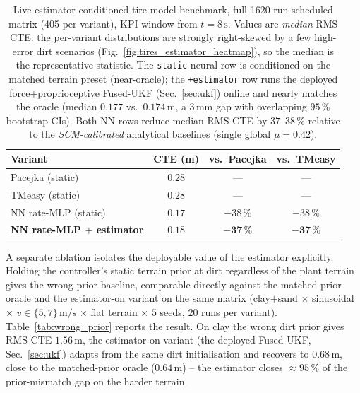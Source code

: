 \documentclass[conference,letterpaper,10pt]{IEEEtran}
\begin{document}
\begin{table}[!t]
  \renewcommand{\arraystretch}{1.15}
  \caption{Live-estimator-conditioned tire-model benchmark, full
    1620-run scheduled matrix (405 per variant), KPI window from
    $t=8\,\mathrm{s}$.
    Values are \emph{median} RMS CTE: the per-variant distributions are
    strongly right-skewed by a few high-error dirt scenarios
    (Fig.~\ref{fig:tires_estimator_heatmap}), so the median is the
    representative statistic. The \texttt{static} neural row is
    conditioned on the matched terrain preset (near-oracle); the
    \texttt{+estimator} row runs the deployed force+proprioceptive
    Fused-UKF (Sec.~\ref{sec:ukf}) online and nearly matches the oracle
    (median $0.177$ vs.\ $0.174\,\mathrm{m}$, a $3\,\mathrm{mm}$ gap with
    overlapping $95\,\%$ bootstrap CIs). Both NN rows reduce median RMS
    CTE by $37$--$38\,\%$ relative to the \emph{SCM-calibrated}
    analytical baselines (single global $\mu\!=\!0.42$).}
  \label{tab:tires_estimator}
  \centering
  \setlength{\tabcolsep}{4pt}
  \begin{tabular}{lccc}
    \toprule
    \textbf{Variant} & \textbf{CTE (m)} & \textbf{vs.\ Pacejka} & \textbf{vs.\ TMeasy}\\
    \midrule
    Pacejka (static)            & $0.28$ & ---       & ---\\
    TMeasy (static)             & $0.28$ & ---       & ---\\
    NN rate-MLP (static)        & $0.17$ & $-38\,\%$ & $-38\,\%$\\
    \textbf{NN rate-MLP $+$ estimator} & $\mathbf{0.18}$ & $\mathbf{-37\,\%}$ & $\mathbf{-37\,\%}$\\
    \bottomrule
  \end{tabular}
\end{table}

A separate ablation isolates the deployable value of the estimator
explicitly. Holding the controller's static terrain prior at dirt
regardless of the plant terrain gives the
wrong-prior baseline, comparable directly against the matched-prior
oracle and the estimator-on variant on the same matrix
(clay$+$sand $\times$ sinusoidal $\times$ $v\in\{5,7\}\,\mathrm{m/s}$
$\times$ flat terrain $\times$ $5$ seeds, $20$ runs per variant).
Table~\ref{tab:wrong_prior} reports the result. On clay the wrong
dirt prior gives RMS CTE $1.56\,\mathrm{m}$, the estimator-on variant
(the deployed Fused-UKF, Sec.~\ref{sec:ukf}) adapts from the same dirt
initialisation and recovers to $0.68\,\mathrm{m}$, close to the
matched-prior oracle ($0.64\,\mathrm{m}$) -- the estimator closes
$\approx 95\,\%$ of the prior-mismatch gap on the harder terrain.
\end{document}
